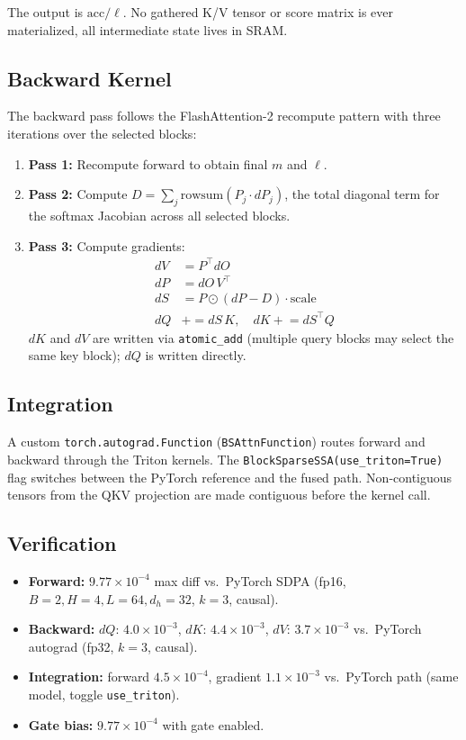 \documentclass[10pt,letterpaper]{article}
\begin{document}
The output is $\text{acc} / \ell$. No gathered K/V tensor or score matrix is
ever materialized, all intermediate state lives in SRAM.

\subsection{Backward Kernel}

The backward pass follows the FlashAttention-2 recompute pattern
\cite{dao2023flashattention2} with three iterations over the selected blocks:

\begin{enumerate}[leftmargin=*,itemsep=1pt]
\item \textbf{Pass 1:} Recompute forward to obtain final $m$ and $\ell$.
\item \textbf{Pass 2:} Compute $D = \sum_j \text{rowsum}(P_j \cdot dP_j)$,
  the total diagonal term for the softmax Jacobian across all selected blocks.
\item \textbf{Pass 3:} Compute gradients:
  \begin{align}
    dV &= P^\top dO \\
    dP &= dO \, V^\top \\
    dS &= P \odot (dP - D) \cdot \text{scale} \\
    dQ &\mathrel{+}= dS \, K, \quad dK \mathrel{+}= dS^\top Q
  \end{align}
  $dK$ and $dV$ are written via \texttt{atomic\_add} (multiple query blocks
  may select the same key block); $dQ$ is written directly.
\end{enumerate}

\subsection{Integration}

A custom \texttt{torch.autograd.Function} (\texttt{BSAttnFunction}) routes
forward and backward through the Triton kernels. The
\texttt{BlockSparseSSA(use\_triton=True)} flag switches between the PyTorch
reference and the fused path. Non-contiguous tensors from the QKV projection
are made contiguous before the kernel call.

\subsection{Verification}

\begin{itemize}[leftmargin=*,itemsep=1pt]
\item \textbf{Forward:} $9.77 \times 10^{-4}$ max diff vs.\ PyTorch SDPA
  (fp16, $B{=}2, H{=}4, L{=}64, d_h{=}32$, $k{=}3$, causal).
\item \textbf{Backward:} $dQ$: $4.0 \times 10^{-3}$, $dK$: $4.4 \times 10^{-3}$,
  $dV$: $3.7 \times 10^{-3}$ vs.\ PyTorch autograd (fp32, $k{=}3$, causal).
\item \textbf{Integration:} forward $4.5 \times 10^{-4}$, gradient
  $1.1 \times 10^{-3}$ vs.\ PyTorch path (same model, toggle
  \texttt{use\_triton}).
\item \textbf{Gate bias:} $9.77 \times 10^{-4}$ with gate enabled.
\end{itemize}
\end{document}
